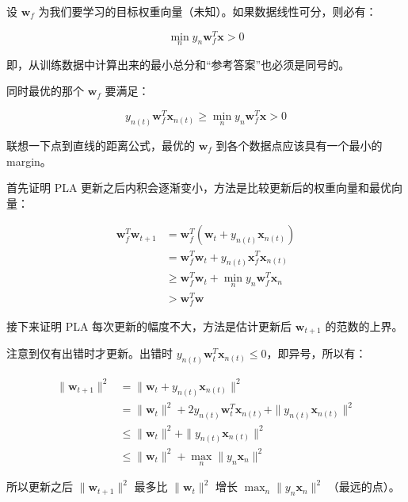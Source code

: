 \documentclass[a4paper]{article}
\begin{document}
设 $\mathbf{w}_f$ 为我们要学习的目标权重向量（未知）。如果数据线性可分，则必有：

$$\min_{n}y_n\mathbf{w}_f^T\mathbf{x} > 0$$

即，从训练数据中计算出来的最小总分和“参考答案”也必须是同号的。

同时最优的那个 $\mathbf{w}_f$ 要满足：

$$y_{n(t)}\mathbf{w}_f^T\mathbf{x}_{n(t)} \ge \min_{n}y_n\mathbf{w}_f^T\mathbf{x} > 0$$

联想一下点到直线的距离公式，最优的 $\mathbf{w}_f$ 到各个数据点应该具有一个最小的 margin。

首先证明 PLA 更新之后内积会逐渐变小，方法是比较更新后的权重向量和最优向量：

\begin{equation}
\label{pla-decrease}
\begin{aligned}
\mathbf{w}_f^T\mathbf{w}_{t+1} &= \mathbf{w}_f^T(\mathbf{w}_t + y_{n(t)}\mathbf{x}_{n(t)}) \\
                               &= \mathbf{w}_f^T\mathbf{w}_t + y_{n(t)}\mathbf{x}_f^T\mathbf{x}_{n(t)} \\
                               &\ge \mathbf{w}_f^T\mathbf{w}_t + \min_{n}y_n\mathbf{w}_f^T\mathbf{x}_n \\
                               &> \mathbf{w}_f^T\mathbf{w}
\end{aligned}
\end{equation}

接下来证明 PLA 每次更新的幅度不大，方法是估计更新后 $\mathbf{w}_{t+1}$ 的范数的上界。

注意到仅有出错时才更新。出错时 $y_{n(t)}\mathbf{w}_t^T\mathbf{x}_{n(t)} \le 0$，即异号，所以有：

\begin{equation}
\label{not-so-large}
\begin{aligned}
\|\mathbf{w}_{t+1}\|^2 &= \|\mathbf{w}_t + y_{n(t)}\mathbf{x}_{n(t)}\|^2 \\
                       &= \|\mathbf{w}_t\|^2 + 2y_{n(t)}\mathbf{w}_t^T\mathbf{x}_{n(t)} + \|y_{n(t)}\mathbf{x}_{n(t)}\|^2 \\
                       &\le \|\mathbf{w}_t\|^2 + \|y_{n(t)}\mathbf{x}_{n(t)}\|^2 \\
                       &\le \|\mathbf{w}_t\|^2 + \max_{n}\|y_n\mathbf{x}_n\|^2
\end{aligned}
\end{equation}

所以更新之后 $\|\mathbf{w}_{t+1}\|^2$ 最多比 $\|\mathbf{w}_t\|^2$ 增长 $\displaystyle\max_{n}\|y_n\mathbf{x}_n\|^2$ （最远的点）。
\end{document}
